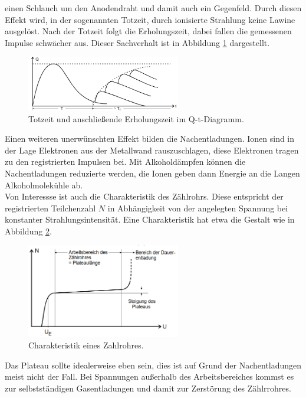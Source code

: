 einen Schlauch um den Anodendraht und damit auch ein Gegenfeld.
Durch diesen Effekt wird, in der sogenannten Totzeit, durch ionisierte Strahlung
keine Lawine ausgelöst. Nach der Totzeit folgt die Erholungszeit, dabei fallen die gemessenen Impulse schwächer aus. Dieser Sachverhalt ist in Abbildung
\ref{fig:totzeit} dargestellt.
\begin{figure}
  \centering
  \includegraphics[width=0.6\textwidth]{tz.PNG}
  \caption{Totzeit und anschließende Erholungszeit im Q-t-Diagramm.}
  \label{fig:totzeit}
\end{figure}
Einen weiteren unerwünschten Effekt bilden die Nachentladungen. Ionen sind in der Lage Elektronen aus der Metallwand rauszuschlagen,
diese Elektronen tragen zu den registrierten Impulsen bei. Mit Alkoholdämpfen können die Nachentladungen reduzierte werden, die
Ionen geben dann Energie an die Langen Alkoholmolekühle ab.\\
Von Interessse ist auch die Charakteristik des Zählrohrs. Diese entspricht der registrierten Teilchenzahl $N$ in Abhängigkeit von der
angelegten Spannung bei konstanter Strahlungsintensität. Eine Charakteristik hat etwa die Gestalt wie in Abbildung \ref{fig:char}.
\begin{figure}
  \centering
  \includegraphics[width=0.6\textwidth]{char.PNG}
  \caption{Charakteristik eines Zahlrohres.}
  \label{fig:char}
\end{figure}
Das Plateau sollte idealerweise eben sein, dies ist auf Grund der Nachentladungen meist nicht der Fall.
Bei Spannungen außerhalb des Arbeitsbereiches kommst es zur selbstständigen Gasentladungen und damit zur Zerstörung des Zählrrohres.
\newpage
